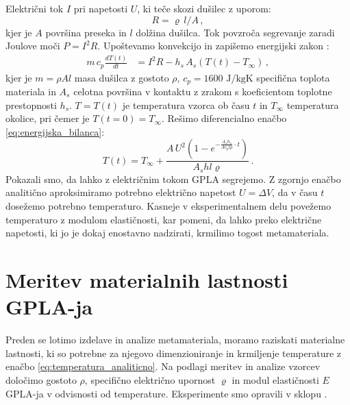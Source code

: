         Električni tok $I$ pri napetosti $U$, ki teče skozi dušilec z uporom: 
        \begin{equation}\label{eq:upor}
            R=\varrho\,l / A \, ,
        \end{equation}
        kjer je $A$ površina preseka in $l$ dolžina dušilca. Tok povzroča segrevanje zaradi Joulove moči $P=I^2R$. Upoštevamo konvekcijo in zapišemo energijski zakon \cite{Soft-Actuators_Al-Rubaiai}:
        \begin{align}\label{eq:energijska_bilanca}
            m \, c_p \frac{dT(t)}{dt}&=I^2R-h_s \, A_s \left( T(t)-T_\infty \right) \, ,
        \end{align}
        kjer je $m=\rho A l$ masa dušilca z gostoto $\rho$, $c_p=1600 \text{ J/kgK}$  specifična toplota materiala \cite{Thermal-properties-of-samples} in $A_s$ celotna površina v kontaktu z zrakom s koeficientom toplotne prestopnosti $h_s$. $T=T(t)$ je temperatura vzorca ob času $t$ in $T_\infty$ temperatura okolice, pri čemer je $T(t=0)=T_\infty$. Rešimo diferencialno enačbo \eqref{eq:energijska_bilanca}:
        \begin{equation}\label{eq:temperatura_analiticno}
            T(t)=T_\infty + \frac{A\,U^2 \left( 1-e^{-\frac{A_s h_s}{A c_p l \rho}\cdot t} \right)}{A_s h l \varrho} \, .
        \end{equation}
        Pokazali smo, da lahko z električnim tokom GPLA segrejemo. Z zgornjo enačbo analitično aproksimiramo potrebno električno napetost $U=\Delta V$, da v času $t$ dosežemo potrebno temperaturo. Kasneje v eksperimentalnem delu povežemo temperaturo z modulom elastičnosti, kar pomeni, da lahko preko električne napetosti, ki jo je dokaj enostavno nadzirati, krmilimo togost metamateriala. 
        
    \newpage
    \section{Meritev materialnih lastnosti GPLA-ja}\label{sec:meritev_materialnih_lastnosti}

        Preden se lotimo izdelave in analize metamateriala, moramo raziskati materialne lastnosti, ki so potrebne za njegovo dimenzioniranje in krmiljenje temperature z enačbo \eqref{eq:temperatura_analiticno}. Na podlagi meritev in analize vzorcev določimo gostoto $\rho$, specifično električno upornost $\varrho$ in modul elastičnosti $E$ GPLA-ja v odvisnosti od temperature. Eksperimente smo opravili v sklopu \cite{Bizjan_2021}.
        
